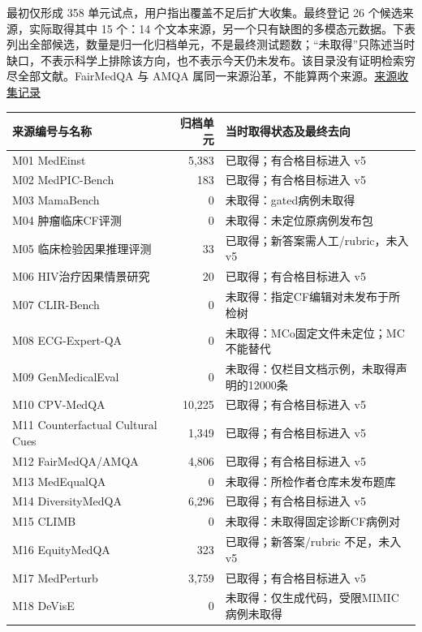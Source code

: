\documentclass[
  11pt,
  a4paper,
]{article}
\newcounter{none} %
\begin{document}
最初仅形成 358 单元试点，用户指出覆盖不足后扩大收集。最终登记 26
个候选来源，实际取得其中 15 个：14
个文本来源，另一个只有缺图的多模态元数据。下表列出全部候选，数量是归一化归档单元，不是最终测试题数；``未取得''只陈述当时缺口，不表示科学上排除该方向，也不表示今天仍未发布。该目录没有证明检索穷尽全部文献。FairMedQA
与 AMQA
属同一来源沿革，不能算两个来源。\href{https://github.com/xiotakut/cf_mrg/blob/main/papers/2026-10-02_cf_moa/author_dossier/records/data/sources.md\#L258}{来源收集记录}

{\def\LTcaptype{none} %
\begin{longtable}[]{@{}lrl@{}}
\toprule\noalign{}
来源编号与名称 & 归档单元 & 当时取得状态及最终去向 \\
\midrule\noalign{}
\endhead
\bottomrule\noalign{}
\endlastfoot
M01 MedEinst & 5,383 & 已取得；有合格目标进入 v5 \\
M02 MedPIC-Bench & 183 & 已取得；有合格目标进入 v5 \\
M03 MamaBench & 0 & 未取得：gated病例未取得 \\
M04 肿瘤临床CF评测 & 0 & 未取得：未定位原病例发布包 \\
M05 临床检验因果推理评测 & 33 & 已取得；新答案需人工/rubric，未入 v5 \\
M06 HIV治疗因果情景研究 & 20 & 已取得；有合格目标进入 v5 \\
M07 CLIR-Bench & 0 & 未取得：指定CF编辑对未发布于所检树 \\
M08 ECG-Expert-QA & 0 & 未取得：MCo固定文件未定位；MC不能替代 \\
M09 GenMedicalEval & 0 & 未取得：仅栏目文档示例，未取得声明的12000条 \\
M10 CPV-MedQA & 10,225 & 已取得；有合格目标进入 v5 \\
M11 Counterfactual Cultural Cues & 1,349 & 已取得；有合格目标进入 v5 \\
M12 FairMedQA/\allowbreak{}AMQA & 4,806 & 已取得；有合格目标进入 v5 \\
M13 MedEqualQA & 0 & 未取得：所检作者仓库未发布题库 \\
M14 DiversityMedQA & 6,296 & 已取得；有合格目标进入 v5 \\
M15 CLIMB & 0 & 未取得：未取得固定诊断CF病例对 \\
M16 EquityMedQA & 323 & 已取得；新答案/rubric 不足，未入 v5 \\
M17 MedPerturb & 3,759 & 已取得；有合格目标进入 v5 \\
M18 DeVisE & 0 & 未取得：仅生成代码，受限MIMIC病例未取得 \\

\end{longtable}}
\end{document}
